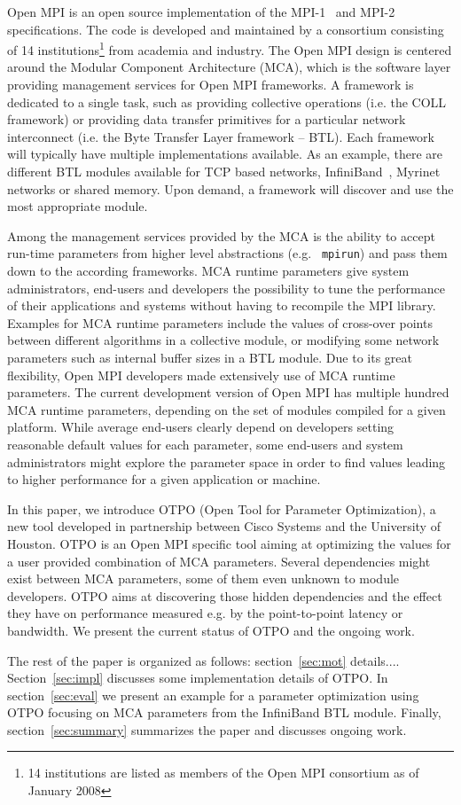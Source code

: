 Open MPI\cite{gabriel:ompi} is an open source implementation of the
MPI-1~\cite{mpi1} and MPI-2~\cite{mpi2} specifications. The code is
developed and maintained by a consortium consisting of 14
institutions\footnote{14 institutions are listed as members of the
Open MPI consortium as of January 2008} from academia and
industry. The Open MPI design is centered around the Modular Component
Architecture (MCA), which is the software layer providing management
services for Open MPI frameworks. A framework is dedicated to a
single task, such as providing collective operations (i.e. the COLL
framework) or providing data transfer primitives for a particular
network interconnect (i.e. the Byte Transfer Layer framework --
BTL). Each framework will typically have multiple implementations
available. As an example, there are different BTL modules available
for TCP based networks, InfiniBand~\cite{ib}, Myrinet networks or
shared memory. Upon demand, a framework will discover and use the most
appropriate module.

Among the management services provided by the MCA is the ability to
accept run-time parameters from higher level abstractions (e.g. {\tt
mpirun}) and pass them down to the according frameworks. MCA runtime
parameters give system administrators, end-users and developers the
possibility to tune the performance of their applications and systems
without having to recompile the MPI library. Examples for MCA runtime
parameters include the values of cross-over points between different 
algorithms in a collective module, or modifying some
network parameters such as internal buffer sizes in a BTL module. Due to its
great flexibility, Open MPI developers made extensively use of MCA runtime parameters.
The current development version of Open MPI has multiple
hundred MCA runtime parameters, depending on the set of modules
compiled for a given platform. While average end-users clearly depend
on developers setting reasonable default values for each parameter,
some end-users and system administrators might explore the
parameter space in order to find values leading to
higher performance for a given application or machine.

In this paper, we introduce OTPO (Open Tool for Parameter
Optimization), a new tool developed in partnership between Cisco
Systems and the University of Houston. OTPO is an Open MPI specific
tool aiming at optimizing the values for a user provided combination
of MCA parameters. Several dependencies might exist between MCA
parameters, some of them even unknown to module developers. OTPO aims
at discovering those hidden dependencies and the effect they have on
performance measured e.g. by the point-to-point latency or
bandwidth. We present the current status of OTPO and the ongoing work.

The rest of the paper is organized as follows: section~\ref{sec:mot}
details.... Section~\ref{sec:impl} discusses some implementation
details of OTPO. In section~\ref{sec:eval} we present an example for a
parameter optimization using OTPO focusing on MCA parameters from the
InfiniBand BTL module. Finally, section~\ref{sec:summary} summarizes
the paper and discusses ongoing work.


